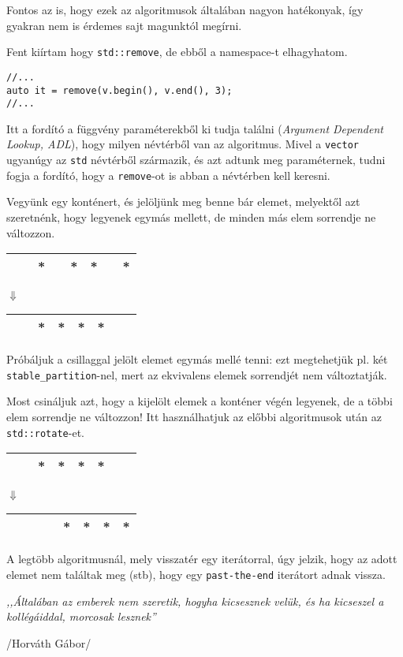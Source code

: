 \documentclass[a4paper,11.5pt]{article}
\begin{document}
	Fontos az is, hogy ezek az algoritmusok általában nagyon hatékonyak, így gyakran nem is érdemes sajt magunktól megírni.
	
	\medskip
	Fent kiírtam hogy \texttt{std::remove}, de ebből a namespace-t elhagyhatom.
	\begin{lstlisting}
//...
auto it = remove(v.begin(), v.end(), 3);
//...
	\end{lstlisting}
	Itt a fordító a függvény paraméterekből ki tudja találni (\textit{Argument Dependent Lookup, ADL}), hogy milyen névtérből van az algoritmus. Mivel a \texttt{vector} ugyanúgy az \texttt{std} névtérből származik, és azt adtunk meg paraméternek, tudni fogja a fordító, hogy a \texttt{remove}-ot is abban a névtérben kell keresni.
	
	\bigskip
	
	Vegyünk egy konténert, és jelöljünk meg benne bár elemet, melyektől azt szeretnénk, hogy legyenek egymás mellett, de minden más elem sorrendje ne változzon.
	\begin{center}
		\begin{tabular}{|c|c|c|c|c|c|c|c|}
			\hline
			&&*&&*&*&&*\\
			\hline
		\end{tabular}
		
		$\Downarrow$
		
		\begin{tabular}{|c|c|c|c|c|c|c|c|}
			\hline
			&&*&*&*&*&&\\
			\hline
		\end{tabular}
	\end{center}
	Próbáljuk a csillaggal jelölt elemet egymás mellé tenni: ezt megtehetjük pl. két \texttt{stable\_partition}-nel, mert az ekvivalens elemek sorrendjét nem változtatják. 
	
	Most csináljuk azt, hogy a kijelölt elemek a konténer végén legyenek, de a többi elem sorrendje ne változzon! Itt használhatjuk az előbbi algoritmusok után az \texttt{std::rotate}-et.
	\begin{center}
		
		\begin{tabular}{|c|c|c|c|c|c|c|c|}
			\hline
			&&*&*&*&*&&\\
			\hline
		\end{tabular}
		
		$\Downarrow$
		
		\begin{tabular}{|c|c|c|c|c|c|c|c|}
			\hline
			&&&&*&*&*&*\\
			\hline
		\end{tabular}
	\end{center}
	A legtöbb algoritmusnál, mely visszatér egy iterátorral, úgy jelzik, hogy az adott elemet nem találtak meg (stb), hogy egy \texttt{past-the-end} iterátort adnak vissza.
	\begin{center}
		\textit{,,Általában az emberek nem szeretik, hogyha kicsesznek velük, és ha kicseszel a kollégáiddal, morcosak lesznek''}
		
		/Horváth Gábor/
	\end{center}
\end{document}
